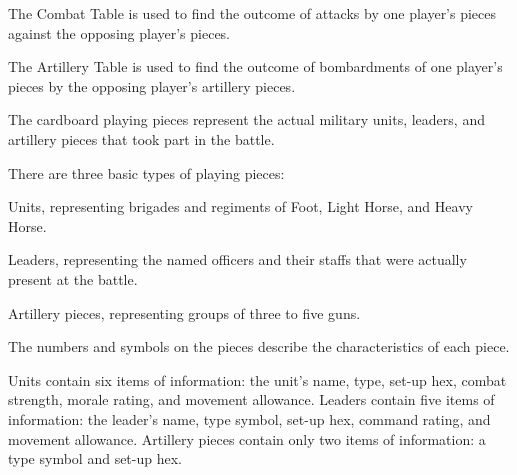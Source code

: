  The Combat Table is used to find the outcome of attacks by one player's pieces against the opposing player's pieces.

 The Artillery Table is used to find the outcome of bombardments of one player's pieces by the opposing player's artillery pieces.

 The cardboard playing pieces represent the actual military units, leaders, and artillery pieces that took part in the battle.

There are three basic types of playing pieces:

\begin{tightitems}
  \item Units, representing brigades and regiments of Foot, Light Horse, and Heavy Horse.
  \item Leaders, representing the named officers and their staffs that were actually present at the battle.
  \item Artillery pieces, representing groups of three to five guns.
\end{tightitems}

 The numbers and symbols on the pieces describe the characteristics of each piece.

Units contain six items of information: the unit's name, type, set-up hex, combat strength, morale rating, and movement allowance. Leaders contain five items of information: the leader's name, type symbol, set-up hex, command rating, and movement allowance. Artillery pieces contain only two items of information: a type symbol and set-up hex.

